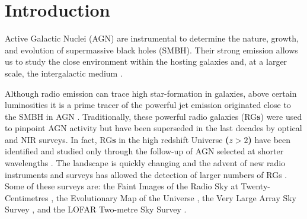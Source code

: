 \documentclass{aa}
\begin{document}

   \maketitle
%

\section{Introduction}\label{sec:introduction}

Active Galactic Nuclei (AGN) are instrumental to determine the nature, growth, and evolution of supermassive black holes (SMBH). Their strong emission allows us to study the close environment within the hosting galaxies and, at a larger scale, the intergalactic medium \citep[e.g.][]{2017A&ARv..25....2P, 2022MNRAS.516.5775B}.

Although radio emission can trace high star-formation in galaxies, above certain luminosities \citep[e.g. $\mathrm{log}L_{1.4\mathrm{GHz}} {>} 25\,\mathrm{W\, Hz^{-1}}$,][]{2021MNRAS.503.1780J} it is a prime tracer of the powerful jet emission originated  close to the SMBH in AGN \citep[Radio Galaxies,][]{2014ARA&A..52..589H}. Traditionally, these powerful radio galaxies (RG\textbf{s}) were used to pinpoint AGN activity but have been superseded in the last decades by optical and NIR surveys. In fact, RG\textbf{s} in the high redshift Universe \textbf{($z > 2$)} have been identified and studied only through the follow-up of AGN selected at shorter wavelengths \citep[optical, NIR, millimetre, and X-rays, e.g.][]{2006ApJ...652..157M, 2020A&A...637A..84P, 2021MNRAS.501.3833D}.
The landscape is quickly changing and the advent of new radio instruments and surveys has allowed the detection of larger numbers of RGs \citep[e.g.][]{2018MNRAS.475.3429W, 2020A&A...642A.107C}. Some of these surveys are: the Faint Images of the Radio Sky at Twenty-Centimetres \citep[FIRST;][]{2015ApJ...801...26H}, the Evolutionary Map of the Universe \citep[EMU;][]{2011PASA...28..215N}, the Very Large Array Sky Survey \citep[VLASS;][]{2020RNAAS...4..175G}, and the LOFAR Two-metre Sky Survey \citep[LoTSS][]{2019A&A...622A...1S}. 
\end{document}
